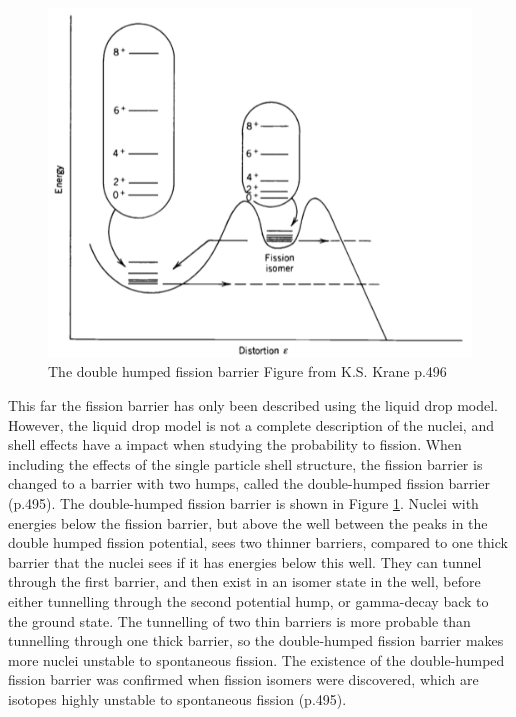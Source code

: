 \documentclass[]{article}
\begin{document}
  \begin{figure} [tbp]
	\centering
	\includegraphics[scale=0.7]{double_humped_fission_barrier.png}
	\caption{The double humped fission barrier Figure from K.S. Krane p.496 \cite{Krane1988}}
	\label{fig:double_humped_fission_barrier}
\end{figure}

\par
\vspace{3mm}

\noindent This far  the fission barrier has only been described using the liquid drop model. However, the liquid drop model is not a complete description of the nuclei, and shell effects have a impact when studying the probability to fission. When including the effects of the single particle shell structure, the fission barrier is changed to a barrier with two humps, called the double-humped fission barrier \cite{Krane1988} (p.495). The double-humped fission barrier is shown in Figure \ref{fig:double_humped_fission_barrier}. Nuclei with energies below the fission barrier, but above the well between the peaks in the double humped fission potential, sees two thinner barriers, compared to one thick barrier that the nuclei sees if it has energies below this well. They can tunnel through the first barrier, and then exist in an isomer state in the well, before either tunnelling through the second potential hump, or gamma-decay back to the ground state.  The tunnelling of two thin barriers is more probable than tunnelling through one thick barrier, so the double-humped fission barrier makes more nuclei unstable to spontaneous fission. The existence of the double-humped fission barrier was confirmed when fission isomers were discovered, which are isotopes highly unstable to spontaneous fission \cite{Krane1988} (p.495). 
\end{document}
